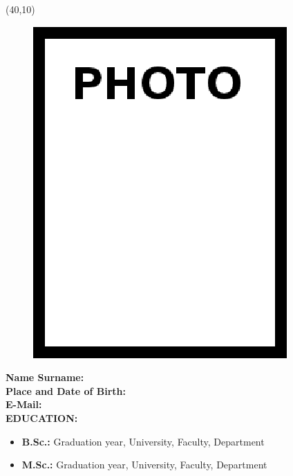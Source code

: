 \vspace{10mm}

\newsavebox{\mysquare}
\savebox{\mysquare}{\textcolor{black}{\rule[2.3pt]{3.4pt}{3.4pt}}}

\setlength{\TPHorizModule}{10pt}
\setlength{\TPVertModule}{10pt}
\begin{textblock}{1}(40,10)
 \begin{figure}[p]
 \includegraphics[scale=0.3,keepaspectratio=true]{./fig/photo}
\end{figure}

\end{textblock}
\textbf{Name Surname:} \\

\vspace{-3mm}
\textbf{Place and Date of Birth:} \\

\vspace{-3mm}
\textbf{E-Mail:} \\


\textbf{EDUCATION:} 
\vspace{-3mm}
\begin{itemize}
  \item \textbf{B.Sc.:} Graduation year, University, Faculty, Department
  \item \textbf{M.Sc.:} Graduation year, University, Faculty, Department
\end{itemize}

